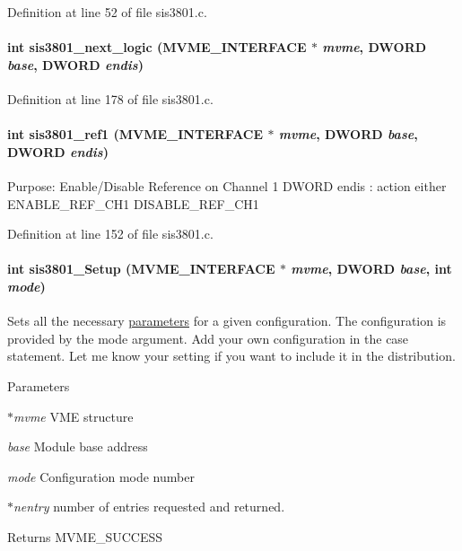 Definition at line 52 of file sis3801.c.
\paragraph[{sis3801\_\-next\_\-logic}]{\setlength{\rightskip}{0pt plus 5cm}int sis3801\_\-next\_\-logic ({\bf MVME\_\-INTERFACE} $\ast$ {\em mvme}, \/  {\bf DWORD} {\em base}, \/  {\bf DWORD} {\em endis})}\hfill\label{sis3801_8c_a379a5301f86fafbd631e55e28699a49f}


Definition at line 178 of file sis3801.c.
\paragraph[{sis3801\_\-ref1}]{\setlength{\rightskip}{0pt plus 5cm}int sis3801\_\-ref1 ({\bf MVME\_\-INTERFACE} $\ast$ {\em mvme}, \/  {\bf DWORD} {\em base}, \/  {\bf DWORD} {\em endis})}\hfill\label{sis3801_8c_a78cc82cf4b2ad2a12f8603dba54b78fc}
Purpose: Enable/Disable Reference on Channel 1 DWORD endis : action either ENABLE\_\-REF\_\-CH1 DISABLE\_\-REF\_\-CH1 

Definition at line 152 of file sis3801.c.
\paragraph[{sis3801\_\-Setup}]{\setlength{\rightskip}{0pt plus 5cm}int sis3801\_\-Setup ({\bf MVME\_\-INTERFACE} $\ast$ {\em mvme}, \/  {\bf DWORD} {\em base}, \/  int {\em mode})}\hfill\label{sis3801_8c_a7d52fd729b9104f9fedce663a0ac0ca1}
Sets all the necessary \hyperlink{structparameters}{parameters} for a given configuration. The configuration is provided by the mode argument. Add your own configuration in the case statement. Let me know your setting if you want to include it in the distribution. 
\begin{DoxyParams}{Parameters}
\item[{\em $\ast$mvme}]VME structure \item[{\em base}]Module base address \item[{\em mode}]Configuration mode number \item[{\em $\ast$nentry}]number of entries requested and returned. \end{DoxyParams}
\begin{DoxyReturn}{Returns}
MVME\_\-SUCCESS 
\end{DoxyReturn}


